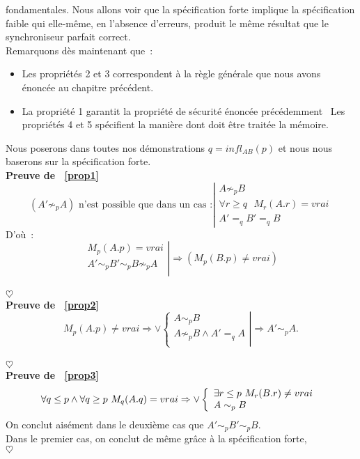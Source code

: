 \documentclass[11pt]{report}
\newcommand{\preuve}[2]{\textbf{Preuve #1} \\
#2\\
$\heartsuit$\\}
\begin{document}
{fondamentales. Nous allons voir que la sp\'ecification forte implique la sp\'ecification
faible qui elle-m\^eme, en l'absence d'erreurs, produit le m\^eme r\'esultat que le
synchroniseur parfait correct.\\
Remarquons d\`es maintenant que~:
\begin{itemize}
\item Les propri\'et\'es 2 et 3 correspondent \`a la r\`egle g\'en\'erale que nous avons
\'enonc\'ee au chapitre pr\'ec\'edent.
\item La propri\'et\'e 1 garantit la propri\'et\'e de s\'ecurit\'e \'enonc\'ee pr\'ec\'edemment
\ Les propri\'et\'es 4 et 5 sp\'ecifient la mani\`ere dont doit \^etre trait\'ee la
m\'emoire.
\end{itemize}
Nous poserons dans toutes nos d\'emonstrations $q = infl_{AB}(p)$ et nous nous baserons
sur la sp\'ecification forte.\\
\preuve{de ~\ref{prop1}}
{
\[ 
(A' \not\sim_{p} A) \mbox{\ n'est possible que dans un cas~:} \left| 
 \begin{array}{ll}
   A \not\sim_{p} B\\
   \forall r \geq q \mbox{\ } M_{r}(A.r) = vrai\\
   A' =_{q} B' =_{q} B
 \end{array} \right. 
\]
D'o\`u~:
\[
\left.
\begin{array}{l}
M_{p}(A.p) = vrai\\
A' \sim_{p} B' \sim_{p} B \not\sim_{p} A\\
\end{array}
\right| \Rightarrow (M_{p}(B.p) \neq vrai) 
\]
}
\preuve{de ~\ref{prop2}}
{\[
M_{p}(A.p) \neq vrai \Rightarrow
\vee \left\{ 
 \begin{array}{l}
  A \sim_{p} B\\
  A \not\sim_{p} B \wedge A' =_{q} A\\
 \end{array} \right|
\Rightarrow A' \sim_{p} A.
\]
}
\preuve{de ~\ref{prop3}}
{\[
\forall q \leq p \wedge \forall q \geq p \mbox{\ } M_{q}(A.q) = vrai \Rightarrow
\vee \left\{
\begin{array}{ll}
\exists r \leq p \mbox{\ } M_{r}(B.r) \neq vrai\\
A \sim_{p} B\\
\end{array} \right.\\
\]
On conclut ais\'ement dans le deuxi\`eme cas que $A' \sim_{p} B' \sim_{p} B$.\\
Dans le premier cas, on conclut de m\^eme gr\^ace \`a la sp\'ecification forte,
}}
\end{document}
